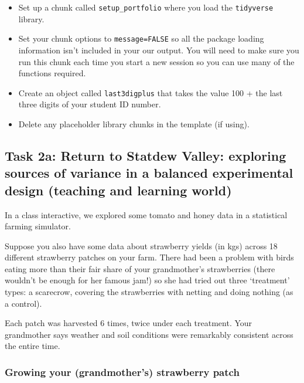 \documentclass[
  openany]{book}
\begin{document}
\begin{itemize}
\item
  Set up a chunk called \texttt{setup\_portfolio} where you load the \texttt{tidyverse} library.
\item
  Set your chunk options to \texttt{message=FALSE} so all the package loading information isn't included in your our output. You will need to make sure you run this chunk each time you start a new session so you can use many of the functions required.
\item
  Create an object called \texttt{last3digplus} that takes the value 100 + the last three digits of your student ID number.
\item
  Delete any placeholder library chunks in the template (if using).
\end{itemize}

\hypertarget{task-2a-return-to-statdew-valley-exploring-sources-of-variance-in-a-balanced-experimental-design-teaching-and-learning-world}{%
\subsection{Task 2a: Return to Statdew Valley: exploring sources of variance in a balanced experimental design (teaching and learning world)}\label{task-2a-return-to-statdew-valley-exploring-sources-of-variance-in-a-balanced-experimental-design-teaching-and-learning-world}}

In a class interactive, we explored some tomato and honey data in a statistical farming simulator.

Suppose you also have some data about strawberry yields (in kgs) across 18 different strawberry patches on your farm. There had been a problem with birds eating more than their fair share of your grandmother's strawberries (there wouldn't be enough for her famous jam!) so she had tried out three `treatment' types: a scarecrow, covering the strawberries with netting and doing nothing (as a control).

Each patch was harvested 6 times, twice under each treatment. Your grandmother says weather and soil conditions were remarkably consistent across the entire time.

\hypertarget{growing-your-grandmothers-strawberry-patch}{%
\subsubsection{Growing your (grandmother's) strawberry patch}\label{growing-your-grandmothers-strawberry-patch}}
\end{document}
